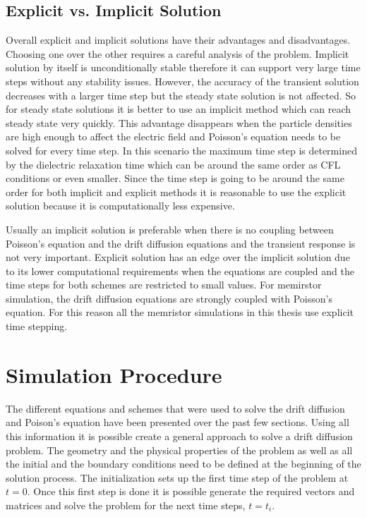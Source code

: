 \begin{doublespace}
\subsection{Explicit vs. Implicit Solution}

Overall explicit and implicit solutions have their advantages and disadvantages. Choosing one over the other requires a careful analysis of the problem. Implicit solution by itself is unconditionally stable therefore it can support very large time steps without any stability issues. However, the accuracy of the transient solution decreases with a larger time step but the steady state solution is not affected. So for steady state solutions it is better to use an implicit method which can reach steady state very quickly. This advantage disappears when the particle densities are high enough to affect the electric field and Poisson's equation needs to be solved for every time step. In this scenario the maximum time step is determined by the dielectric relaxation time which can be around the same order as CFL conditions or even smaller. Since the time step is going to be around the same order for both implicit and explicit methods it is reasonable to use the explicit solution because it is computationally less expensive.

Usually an implicit solution is preferable when there is no coupling between Poisson's equation and the drift diffusion equations and the transient response is not very important. Explicit solution has an edge over the implicit solution due to its lower computational requirements when the equations are coupled and the time steps for both schemes are restricted to small values. For memirstor simulation, the drift diffusion equations are strongly coupled with Poisson's equation. For this reason all the memristor simulations in this thesis use explicit time stepping. 


\clearpage
\section{Simulation Procedure}
The different equations and schemes that were used to solve the drift diffusion  and Poison's equation have been presented over the past few sections. Using all this information it is possible create a general approach to solve a drift diffusion problem. The geometry and the physical properties of the problem as well as all the initial and the boundary conditions need to be defined at the beginning of the solution process. The initialization sets up the first time step of the problem at $t=0$. Once this first step is done it is possible generate the required vectors and matrices and solve the problem for the next time steps, $t=t_i$. 


\end{doublespace}
